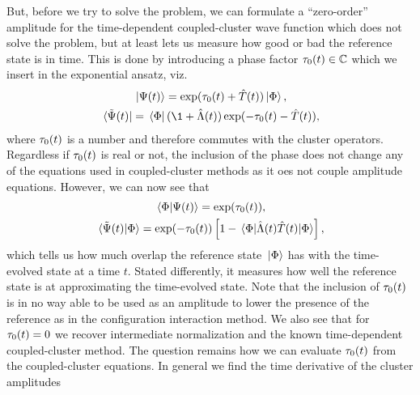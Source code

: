             But, before we try to solve the problem, we can formulate a
            ``zero-order'' amplitude for the time-dependent coupled-cluster wave
            function which does not solve the problem, but at least lets us
            measure how good or bad the reference state is in time.
            This is done by introducing a phase factor $\tau_0(t) \in
            \mathbb{C}$ which we insert in the exponential ansatz, viz.
            \begin{gather}
                \ket*{\Psi(t)}
                = \exponential(\clustamp_0(t) + \clust(t))\ket*{\slat},
                \\
                \bra*{\tilde{\Psi}(t)}
                = \bra*{\slat}(\1 + \clustl(t))
                \exponential(-\clustamp_0(t) - \clust(t)),
            \end{gather}
            where $\tau_0(t)$ is a number and therefore commutes with the
            cluster operators.
            Regardless if $\tau_0(t)$ is real or not, the inclusion of the
            phase does not change any of the equations used in coupled-cluster
            methods as it oes not couple amplitude equations.
            However, we can now see that
            \begin{gather}
                \braket*{\slat}{\Psi(t)} = \exponential(\clustamp_0(t)),
                \\
                \braket*{\tilde{\Psi}(t)}{\slat}
                = \exponential(-\clustamp_0(t)) \brak{
                    1
                    - \mel*{\slat}{
                        \clustl(t)
                        \clust(t)
                    }{\slat}
                },
            \end{gather}
            which tells us how much overlap the reference state $\ket*{\Phi}$ has
            with the time-evolved state at a time $t$.
            Stated differently, it measures how well the reference state
            is at approximating the time-evolved state.
            Note that the inclusion of $\tau_0(t)$ is in no way able to be
            used as an amplitude to lower the presence of the reference as in
            the configuration interaction method.
            We also see that for $\tau_0(t) = 0$ we recover intermediate
            normalization and the known time-dependent coupled-cluster method.
            The question remains how we can evaluate $\tau_0(t)$ from the
            coupled-cluster equations.
            In general we find the time derivative of the cluster amplitudes
